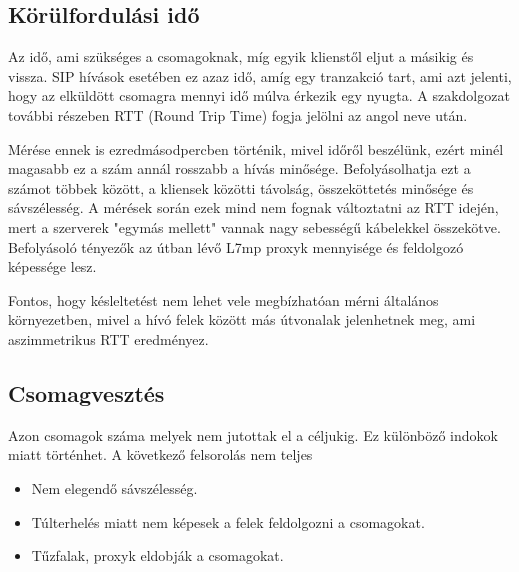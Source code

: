\subsection{Körülfordulási idő}

Az idő, ami szükséges a csomagoknak, míg egyik klienstől eljut a másikig és vissza. SIP
hívások esetében ez azaz idő, amíg egy tranzakció tart, ami azt jelenti, hogy az elküldött
csomagra mennyi idő múlva érkezik egy nyugta. A szakdolgozat további részeben RTT (Round 
Trip Time) fogja jelölni az angol neve után. 

Mérése ennek is ezredmásodpercben történik, mivel időről beszélünk, ezért minél magasabb 
ez a szám annál rosszabb a hívás minősége. Befolyásolhatja ezt a számot többek 
között, a kliensek közötti távolság, összeköttetés minősége és sávszélesség. A mérések 
során ezek mind nem fognak változtatni az RTT idején, mert a szerverek "egymás mellett" 
vannak nagy sebességű kábelekkel összekötve. Befolyásoló tényezők az útban lévő L7mp 
proxyk mennyisége és feldolgozó képessége lesz. 

Fontos, hogy késleltetést nem lehet vele megbízhatóan mérni általános környezetben, mivel 
a hívó felek között más útvonalak jelenhetnek meg, ami aszimmetrikus RTT eredményez. 

%

\subsection{Csomagvesztés}

Azon csomagok száma melyek nem jutottak el a céljukig. Ez különböző indokok miatt 
történhet. A következő felsorolás nem teljes \cite{measure}

\begin{itemize}
	\item Nem elegendő sávszélesség. 
	\item Túlterhelés miatt nem képesek a felek feldolgozni a csomagokat.
	\item Tűzfalak, proxyk eldobják a csomagokat. 
\end{itemize}

